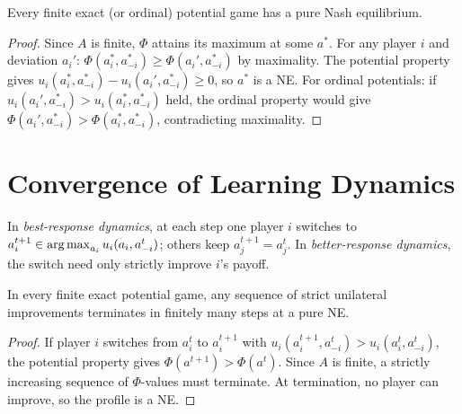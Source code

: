 \documentclass[11pt,a4paper]{article}
\begin{document}
\begin{keyresult}[title={Pure NE in Potential Games}]
\begin{theorem}
\label{thm:potential-pure-ne}
Every finite exact (or ordinal) potential game has a pure Nash
equilibrium.
\end{theorem}
\end{keyresult}

\begin{proof}
Since $A$ is finite, $\Phi$ attains its maximum at some $a^*$. For any
player $i$ and deviation $a_i'$:
$\Phi(a_i^*, a_{-i}^*) \geq \Phi(a_i', a_{-i}^*)$ by maximality.
The potential property gives
$u_i(a_i^*, a_{-i}^*) - u_i(a_i', a_{-i}^*) \geq 0$, so $a^*$ is a
NE. For ordinal potentials: if
$u_i(a_i', a_{-i}^*) > u_i(a_i^*, a_{-i}^*)$ held, the ordinal
property would give
$\Phi(a_i', a_{-i}^*) > \Phi(a_i^*, a_{-i}^*)$, contradicting
maximality.
\end{proof}


\section{Convergence of Learning Dynamics}
\label{sec:convergence}

\begin{definition}
\label{def:br-dynamics}
In \emph{best-response dynamics}, at each step one player $i$ switches
to $a_i^{t+1} \in \operatorname{arg\,max}_{a_i}u_i(a_i, a_{-i}^t)$; others keep
$a_j^{t+1} = a_j^t$. In \emph{better-response dynamics}, the switch
need only strictly improve $i$'s payoff.
\end{definition}

\begin{keyresult}[title={Finite Improvement Property}]
\begin{theorem}
\label{thm:fip}
In every finite exact potential game, any sequence of strict unilateral
improvements terminates in finitely many steps at a pure NE.
\end{theorem}
\end{keyresult}

\begin{proof}
If player $i$ switches from $a_i^t$ to $a_i^{t+1}$ with
$u_i(a_i^{t+1}, a_{-i}^t) > u_i(a_i^t, a_{-i}^t)$, the potential
property gives $\Phi(a^{t+1}) > \Phi(a^t)$. Since $A$ is finite, a
strictly increasing sequence of $\Phi$-values must terminate. At
termination, no player can improve, so the profile is a NE.
\end{proof}
\end{document}
